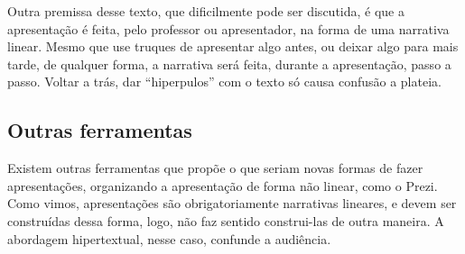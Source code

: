 Outra premissa desse texto, que dificilmente pode ser discutida, é que a apresentação é feita, pelo professor ou apresentador, na forma de uma narrativa linear.
Mesmo que use truques de apresentar algo antes, ou deixar algo para mais tarde, de qualquer forma, a narrativa será feita, durante a apresentação, passo a passo.
Voltar a trás, dar ``hiperpulos'' com o texto só causa confusão a plateia.

\subsection{Outras ferramentas}

Existem outras ferramentas que propõe o que seriam novas formas de fazer apresentações, organizando a apresentação de forma não linear, como o Prezi.
Como vimos, apresentações são obrigatoriamente narrativas lineares, e devem ser construídas dessa forma, logo, não faz sentido construi-las de outra maneira.
A abordagem hipertextual, nesse caso, confunde a audiência.